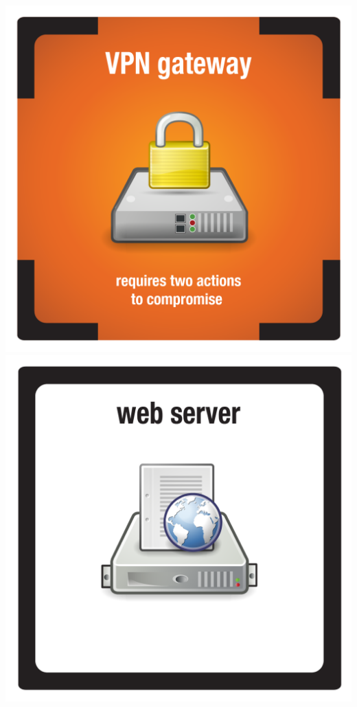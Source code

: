 \documentclass{letter}
\begin{document}
\includegraphics{tiles/node_vpn_gateway_compromised}
\includegraphics{tiles/node_web_server} \\
\end{document}
